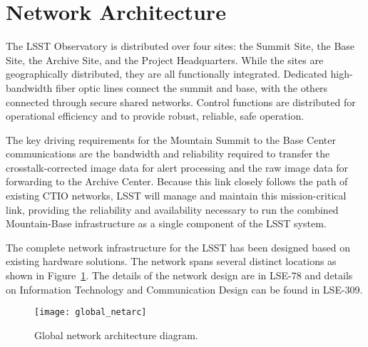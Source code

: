 \section{Network Architecture} \label{sec:netarc}



The LSST Observatory is distributed over four sites: the Summit Site, the Base Site, the Archive Site, 
and the Project Headquarters. While the sites are geographically distributed, they are all functionally 
integrated. Dedicated high-bandwidth fiber optic lines connect the summit and base, with the others 
connected through secure shared networks. Control functions are distributed for operational efficiency 
and to provide robust, reliable, safe operation.


The key driving requirements for the Mountain Summit to the Base Center communications are the 
bandwidth and reliability required to transfer the crosstalk-corrected image data for alert processing and 
the raw image data for forwarding to the Archive Center. Because this link closely follows the path of 
existing CTIO networks, LSST will manage and maintain this mission-critical link, providing the reliability 
and availability necessary to run the combined Mountain-Base infrastructure as a single component of 
the LSST system.


The complete network infrastructure for the LSST has been designed based on existing hardware 
solutions. The network spans several distinct locations as shown in Figure~\ref{fig:global_netarc}. 
The details of the network design are in LSE-78 and details on Information Technology 
and Communication Design can be found in LSE-309. 


\begin{figure}
\begin{center}
\texttt{[image: global\_netarc]}
\caption{Global network architecture diagram. \label{fig:global_netarc}}
\end{center}
\end{figure}


